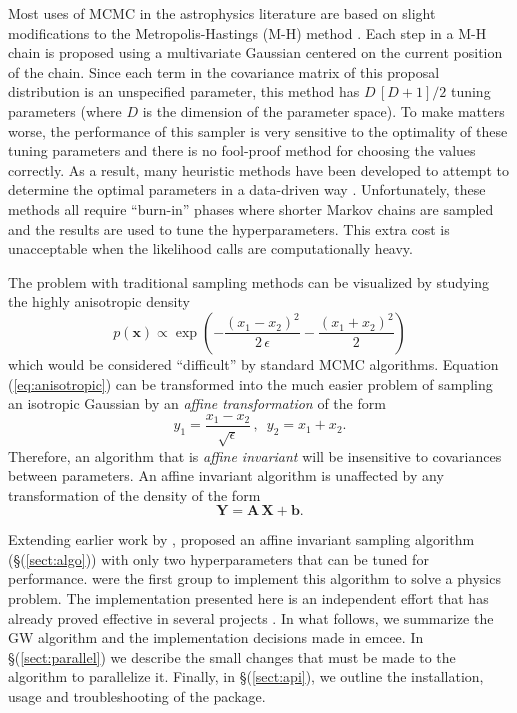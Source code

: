 \documentclass[12pt,preprint]{aastex}
\newcommand{\project}[1]{{\sffamily #1}}
\newcommand{\thisplain}{emcee}
\newcommand{\this}{\project{\thisplain}}
\newcommand{\Eq}[1]{Equation (\ref{eq:#1})}
\newcommand{\eqlabel}[1]{\label{eq:#1}}
\newcommand{\sect}[1]{\S (\ref{sect:#1})}
\begin{document}
Most uses of MCMC in the astrophysics literature are based on slight
modifications to the Metropolis-Hastings (M-H) method
\citep[e.g.][]{MacKay:2003}. Each step in a M-H chain is proposed using a
multivariate Gaussian centered on the current position of the chain. Since
each term in the covariance matrix of this proposal distribution is an
unspecified parameter, this method has $D\,[D+1]/2$ tuning parameters (where
$D$ is the dimension of the parameter space).  To make matters worse, the
performance of this sampler is very sensitive to the optimality of these
tuning parameters and there is no fool-proof method for choosing the values
correctly. As a result, many heuristic methods have been developed to attempt
to determine the optimal parameters in a data-driven way
\citep[e.g.][]{Gregory:2005,Dunkley:2005,Widrow:2008}. Unfortunately, these
methods all require ``burn-in'' phases where shorter Markov chains
are sampled and the results are used to tune the hyperparameters. This extra
cost is unacceptable when the likelihood calls are computationally heavy.

The problem with traditional sampling methods can be visualized by studying
the highly anisotropic density
\begin{equation}
    \eqlabel{anisotropic}
    p(\mathbf{x}) \propto \exp \left (-\frac{(x_1-x_2)^2}{2\,\epsilon}
                                        - \frac{(x_1+x_2)^2}{2} \right )
\end{equation}
which would be considered ``difficult'' by standard MCMC algorithms.
\Eq{anisotropic} can be transformed into the much easier problem of sampling
an isotropic Gaussian by an \emph{affine transformation} of the form
\begin{equation}
    y_1 = \frac{x_1-x_2}{\sqrt{\epsilon}} \, , \,\,\, y_2 = x_1 + x_2.
\end{equation}
Therefore, an algorithm that is \emph{affine invariant} will be insensitive to
covariances between parameters. An affine invariant algorithm is unaffected by
any transformation of the density of the form
\begin{equation}
    \mathbf{Y} = \mathbf{A}\, \mathbf{X} + \mathbf{b}.
\end{equation}

Extending earlier work by \citet{Christen:2007},
\citet[][hereafter GW]{Goodman:2010} proposed an affine invariant sampling
algorithm (\sect{algo}) with only two hyperparameters that can be tuned for
performance. \citet{Hou:2011} were the first group to implement this
algorithm to solve a physics problem. The implementation presented here is
an independent effort that has already proved effective in several projects
\citep[][Foreman-Mackey \& Widrow~2012, in prep.]{Lang:2011,
Bovy:2011, Dorman:2012}.
In what follows, we summarize the GW algorithm and the implementation
decisions made in \this. In \sect{parallel} we describe the small changes
that must be made to the algorithm to parallelize it. Finally, in \sect{api},
we outline the installation, usage and troubleshooting of the package.
\end{document}
